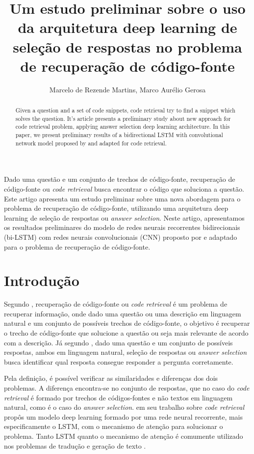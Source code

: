 \documentclass[12pt]{article}
\title{Um estudo preliminar sobre o uso da arquitetura deep learning de seleção de respostas no problema de recuperação de código-fonte}
\author{Marcelo de Rezende Martins\inst{1}, Marco Aurélio Gerosa\inst{2}}
\begin{document}
 

\maketitle

\begin{abstract}
  Given a question and a set of code snippets, code retrieval try to find a snippet which solves the question. It's article presents a preliminary study about new approach for code retrieval problem, applying answer selection deep learning architecture. In this paper, we present preliminary results of a bidirectional LSTM with convolutional network model proposed by \cite{tan-lstm-qa} and adapted for code retrieval.
\end{abstract}
     
\begin{resumo} 
  Dado uma questão e um conjunto de trechos de código-fonte, recuperação de código-fonte ou \textit{code retrieval} busca encontrar o código que soluciona a questão. Este artigo apresenta um estudo preliminar sobre uma nova abordagem para o problema de recuperação de código-fonte, utilizando uma arquitetura deep learning de seleção de respostas ou \textit{answer selection}. Neste artigo, apresentamos os resultados preliminares do modelo de redes neurais recorrentes bidirecionais (bi-LSTM) com redes neurais convolucionais (CNN) proposto por \cite{tan-lstm-qa} e adaptado para o problema de recuperação de código-fonte.
\end{resumo}


\section{Introdução}

Segundo \cite{Allamanis-bimodal-source-code-natural-language:2015}, recuperação de código-fonte ou \textit{code retrieval} é um problema de recuperar informação, onde dado uma questão ou uma descrição em linguagem natural e um conjunto de possíveis trechos de código-fonte, o objetivo é recuperar o trecho de código-fonte que solucione a questão ou seja mais relevante de acordo com a descrição. Já segundo \cite{lai-etal-2018-review},
dado uma questão e um conjunto de possíveis respostas, ambos em linguagem natural, seleção de respostas ou \textit{answer selection} busca identificar qual resposta consegue responder a 
pergunta corretamente. 

Pela definição, é possível verificar as similaridades e diferenças dos dois problemas. A diferença encontra-se no conjunto de respostas, que no caso do \textit{code retrieval} é formado por trechos de códigos-fontes e não textos em linguagem natural, como é o caso do \textit{answer selection}. \cite{iyer-etal-2016-summarizing} em seu trabalho sobre \textit{code retrieval} propôs um modelo deep learning formado por uma rede neural recorrente, mais especificamente o LSTM, com o mecanismo de atenção para solucionar
o problema. Tanto LSTM quanto o mecanismo de atenção é comumente utilizado nos problemas de tradução e geração de texto \cite{bahdanau2014neural, rush-etal-2015-neural}. 
\end{document}
